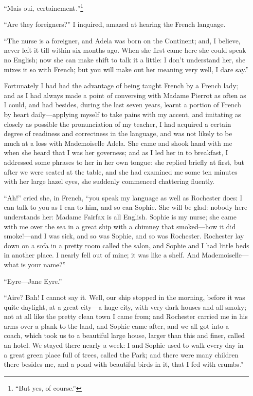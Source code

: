 \foreignquote{french}{Mais oui, certainement.}\footnote{\enquote{But yes, of course.}}

\enquote{Are they foreigners?} I inquired, amazed at hearing the French
language.

\enquote{The nurse is a foreigner, and Adela was born on the Continent;
	and, I believe, never left it till within six months ago. When she
	first came here she could speak no English; now she can make shift to
	talk it a little: I don't understand her, she mixes it so with French;
	but you will make out her meaning very well, I dare say.}

Fortunately I had had the advantage of being taught French by a French
lady; and as I had always made a point of conversing with Madame Pierrot
as often as I could, and had besides, during the last seven years,
learnt a portion of French by heart daily---applying myself to take
pains with my accent, and imitating as closely as possible the
pronunciation of my teacher, I had acquired a certain degree of
readiness and correctness in the language, and was not likely to be much
at a loss with Mademoiselle Adela. She came and shook hand with me when
she heard that I was her governess; and as I led her in to breakfast, I
addressed some phrases to her in her own tongue: she replied briefly at
first, but after we were seated at the table, and she had examined me
some ten minutes with her large hazel eyes, she suddenly commenced
chattering fluently.

\enquote{Ah!} cried she, in French, \enquote{you speak my language as
	well as \Mr{} Rochester does: I can talk to you as I can to him, and so
	can Sophie. She will be glad: nobody here understands her: Madame
	Fairfax is all English. Sophie is my nurse; she came with me over the
	sea in a great ship with a chimney that smoked---how it did smoke!---and
	I was sick, and so was Sophie, and so was \Mr{} Rochester. \Mr{} Rochester
	lay down on a sofa in a pretty room called the salon, and Sophie and I
	had little beds in another place. I nearly fell out of mine; it was
	like a shelf. And Mademoiselle---what is your name?}

\enquote{Eyre---Jane Eyre.}

\enquote{Aire? Bah! I cannot say it. Well, our ship stopped in the
	morning, before it was quite daylight, at a great city---a huge city,
	with very dark houses and all smoky; not at all like the pretty clean
	town I came from; and \Mr{} Rochester carried me in his arms over a plank
	to the land, and Sophie came after, and we all got into a coach, which
	took us to a beautiful large house, larger than this and finer, called
	an hotel. We stayed there nearly a week: I and Sophie used to walk
	every day in a great green place full of trees, called the Park; and
	there were many children there besides me, and a pond with beautiful
	birds in it, that I fed with crumbs.}

